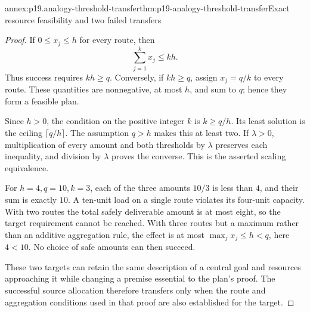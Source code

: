 \begin{annexitem}{annex:p19.analogy-threshold-transfer}{thm:p19-analogy-threshold-transfer}{Exact resource feasibility and two failed transfers}
\begin{proof}
If \(0\le x_j\le h\) for every route, then
\[
                       \sum_{j=1}^k x_j\le kh.
\]
Thus success requires \(kh\ge q\).
Conversely, if \(kh\ge q\), assign
\(x_j=q/k\) to every route. These quantities
are nonnegative, at most \(h\), and sum
to \(q\); hence they form a feasible plan.

Since \(h>0\), the condition on the positive
integer \(k\) is \(k\ge q/h\). Its least
solution is the ceiling \(\lceil q/h\rceil\).
The assumption \(q>h\) makes this at least
two. If \(\lambda>0\), multiplication of
every amount and both thresholds by
\(\lambda\) preserves each inequality,
and division by \(\lambda\) proves the
converse. This is the asserted scaling
equivalence.

For \(h=4,q=10,k=3\), each of the three
amounts \(10/3\) is less than \(4\), and
their sum is exactly \(10\). A ten-unit
load on a single route violates its
four-unit capacity.
With two routes the total safely deliverable
amount is at most eight, so the target
requirement cannot be reached. With three
routes but a maximum rather than an
additive aggregation rule, the effect
is at most
\(\max_jx_j\le h<q\), here \(4<10\). No choice of safe
amounts can then succeed.

These two targets can retain the same
description of a central goal and resources
approaching it while changing a premise
essential to the plan's proof. The successful
source allocation therefore transfers only
when the route and aggregation conditions
used in that proof are also established
for the target.
\end{proof}
\end{annexitem}


